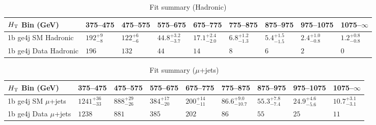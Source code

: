\documentclass[8pt]{article}
\def\scalht{\mbox{$H_{\rm{T}}$}\xspace}
\newcommand\T{\rule{0pt}{2.6ex}}
\begin{document}
\begin{table}[ht!]
\caption{Fit summary (Hadronic)}
\label{tab:ensemble-summary}
\centering
\begin{tabular}{ lllllllll }

\hline
\scalht Bin (GeV)       & 375--475                       & 475--575                       & 575--675                       & 675--775                       & 775--875                       & 875--975                       & 975--1075                      & 1075--$\infty$                 \\ [1.000000ex]
\hline
1b ge4j SM Hadronic\T   & $192^{+9}_{-8}$                & $122^{+6}_{-6}$                & $44.8^{+3.2}_{-3.7}$           & $17.1^{+2.4}_{-2.0}$           & $6.8^{+1.2}_{-1.3}$            & $5.4^{+1.5}_{-1.5}$            & $2.4^{+1.0}_{-0.8}$            & $1.2^{+0.8}_{-0.8}$            \\ 
1b ge4j Data Hadronic\T & $196$                          & $132$                          & $44$                           & $14$                           & $8$                            & $6$                            & $2$                            & $0$                            \\ 
\hline

\end{tabular}
\end{table}
\begin{table}[ht!]
\caption{Fit summary ($\mu$+jets)}
\label{tab:ensemble-summary}
\centering
\begin{tabular}{ lllllllll }

\hline
\scalht Bin (GeV)       & 375--475                       & 475--575                       & 575--675                       & 675--775                       & 775--875                       & 875--975                       & 975--1075                      & 1075--$\infty$                 \\ [1.000000ex]
\hline
1b ge4j SM $\mu$+jets\T & $1241^{+36}_{-33}$             & $888^{+29}_{-26}$              & $384^{+17}_{-20}$              & $200^{+14}_{-11}$              & $86.6^{+9.0}_{-10.7}$          & $55.3^{+7.8}_{-7.4}$           & $24.9^{+4.6}_{-5.6}$           & $10.7^{+3.1}_{-3.1}$           \\ 
1b ge4j Data $\mu$+jets\T & $1238$                         & $881$                          & $385$                          & $202$                          & $86$                           & $55$                           & $25$                           & $11$                           \\ 
\hline

\end{tabular}
\end{table}
\end{document}
